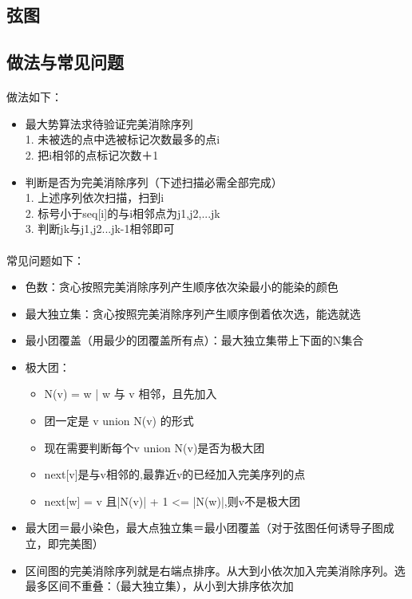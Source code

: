 \documentclass[landscape]{report}
\begin{document}
\begin{flushleft}
\begin{multicols}{2}
\section{弦图}
\subsection{ 做法与常见问题}
\paragraph{ }
做法如下：
\begin{itemize}
\item  最大势算法求待验证完美消除序列\\
     1. 未被选的点中选被标记次数最多的点i\\
     2. 把i相邻的点标记次数＋1
 \item  判断是否为完美消除序列（下述扫描必需全部完成）\\
     1. 上述序列依次扫描，扫到i\\
     2. 标号小于seq[i]的与i相邻点为j1,j2,...jk\\
     3. 判断jk与j1,j2...jk-1相邻即可\\
\end{itemize}
\paragraph{ }
常见问题如下：
\begin{itemize}
\item  色数：贪心按照完美消除序列产生顺序依次染最小的能染的颜色
\item 最大独立集：贪心按照完美消除序列产生顺序倒着依次选，能选就选
 \item 最小团覆盖（用最少的团覆盖所有点）：最大独立集带上下面的N集合
  \item 极大团：
  		\begin{itemize}
  		
    	\item N(v) = {w | w 与 v 相邻，且先加入}
       \item 团一定是 v union N(v) 的形式
      \item 现在需要判断每个v union N(v)是否为极大团
     \item next[v]是与v相邻的,最靠近v的已经加入完美序列的点
     \item next[w] = v 且|N(v)| + 1 <= |N(w)|,则v不是极大团
    
  		\end{itemize}
  \item  最大团＝最小染色，最大点独立集＝最小团覆盖（对于弦图任何诱导子图成立，即完美图）
  \item 区间图的完美消除序列就是右端点排序。从大到小依次加入完美消除序列。选最多区间不重叠：（最大独立集），从小到大排序依次加
\end{itemize}


\end{multicols}
\end{flushleft}
\end{document}

